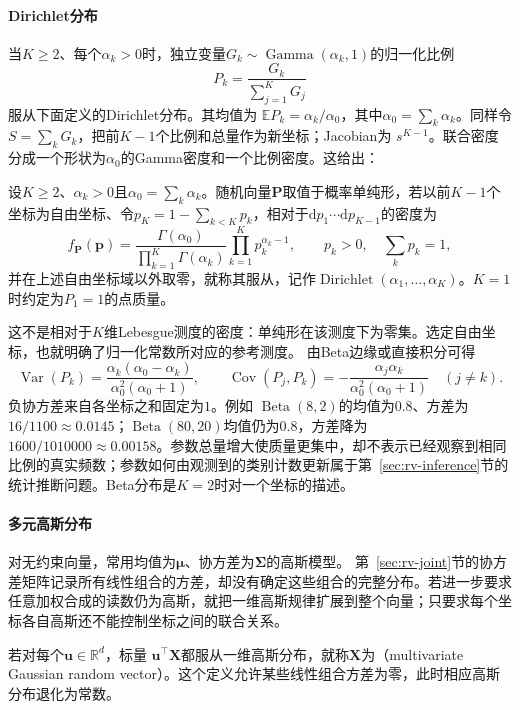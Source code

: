 \paragraph{Dirichlet分布}
当\(K\geq2\)、每个\(\alpha_k>0\)时，独立变量\(G_k\sim\operatorname{Gamma}(\alpha_k,1)\)的归一化比例
\[ P_k=\frac{G_k}{\sum_{j=1}^{K}G_j} \]
服从下面定义的Dirichlet分布。其均值为
\(\mathbb{E}P_k=\alpha_k/\alpha_0\)，其中\(\alpha_0=\sum_k\alpha_k\)。同样令
\(S=\sum_kG_k\)，把前\(K-1\)个比例和总量作为新坐标；Jacobian为
\(s^{K-1}\)。联合密度分成一个形状为\(\alpha_0\)的Gamma密度和一个比例密度。这给出：
\begin{definition}[Dirichlet分布]
  \label{def:probability-dirichlet-distribution}
设\(K\geq2\)、\(\alpha_k>0\)且\(\alpha_0=\sum_k\alpha_k\)。随机向量\(\bm P\)取值于概率单纯形，若以前\(K-1\)个坐标为自由坐标、令\(p_K=1-\sum_{k<K}p_k\)，相对于\(\mathrm dp_1\cdots\mathrm dp_{K-1}\)的密度为
\[
  f_{\bm{P}}(\bm{p})
  =
  \frac{\Gamma(\alpha_0)}
       {\prod_{k=1}^{K}\Gamma(\alpha_k)}
  \prod_{k=1}^{K}p_k^{\alpha_k-1},
  \qquad p_k>0,\quad\sum_kp_k=1,
\]
并在上述自由坐标域以外取零，就称其服从，记作\(\operatorname{Dirichlet}(\alpha_1,\ldots,\alpha_K)\)。\(K=1\)时约定为\(P_1=1\)的点质量。
\end{definition}
这不是相对于\(K\)维Lebesgue测度的密度：单纯形在该测度下为零集。选定自由坐标，也就明确了归一化常数所对应的参考测度。
由Beta边缘或直接积分可得
\[
  \operatorname{Var}(P_k)
  =\frac{\alpha_k(\alpha_0-\alpha_k)}
        {\alpha_0^2(\alpha_0+1)},\qquad
  \operatorname{Cov}(P_j,P_k)
  =-\frac{\alpha_j\alpha_k}
         {\alpha_0^2(\alpha_0+1)}
  \quad(j\neq k).
\]
负协方差来自各坐标之和固定为\(1\)。例如
\(\operatorname{Beta}(8,2)\)的均值为\(0.8\)、方差为
\(16/1100\approx0.0145\)；\(\operatorname{Beta}(80,20)\)均值仍为\(0.8\)，方差降为
\(1600/1010000\approx0.00158\)。参数总量增大使质量更集中，却不表示已经观察到相同比例的真实频数；参数如何由观测到的类别计数更新属于第~\ref{sec:rv-inference}节的统计推断问题。Beta分布是\(K=2\)时对一个坐标的描述。

\paragraph{多元高斯分布}
对无约束向量，常用均值为\(\bm\mu\)、协方差为\(\bm\Sigma\)的高斯模型。
第~\ref{sec:rv-joint}节的协方差矩阵记录所有线性组合的方差，却没有确定这些组合的完整分布。若进一步要求任意加权合成的读数仍为高斯，就把一维高斯规律扩展到整个向量；只要求每个坐标各自高斯还不能控制坐标之间的联合关系。
\begin{definition}[多元高斯随机向量]
  \label{def:probability-multivariate-gaussian}
  若对每个\(\bm{u}\in\mathbb{R}^d\)，标量
\(\bm{u}^{\top}\bm{X}\)都服从一维高斯分布，就称\(\bm{X}\)为（multivariate Gaussian random vector）。这个定义允许某些线性组合方差为零，此时相应高斯分布退化为常数。
\end{definition}

